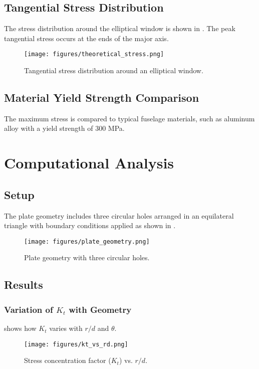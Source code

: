 \documentclass[a4paper,11pt]{article}
\begin{document}
\subsection{Tangential Stress Distribution}
The stress distribution around the elliptical window is shown in . The peak tangential stress occurs at the ends of the major axis.

\begin{figure}[H]
    \centering
    \texttt{[image: figures/theoretical\_stress.png]}
    \caption{Tangential stress distribution around an elliptical window.}
    \label{fig:theoretical_stress}
\end{figure}

\subsection{Material Yield Strength Comparison}
The maximum stress is compared to typical fuselage materials, such as aluminum alloy with a yield strength of 300 MPa.

\newpage

\section{Computational Analysis}
\subsection{Setup}
The plate geometry includes three circular holes arranged in an equilateral triangle with boundary conditions applied as shown in .
\begin{figure}[H]
    \centering
    \texttt{[image: figures/plate\_geometry.png]}
    \caption{Plate geometry with three circular holes.}
    \label{fig:plate_geometry}
\end{figure}

\subsection{Results}
\subsubsection{Variation of \(K_t\) with Geometry}
 shows how \(K_t\) varies with \(r/d\) and \(\theta\).

\begin{figure}[H]
    \centering
    \texttt{[image: figures/kt\_vs\_rd.png]}
    \caption{Stress concentration factor (\(K_t\)) vs. \(r/d\).}
    \label{fig:kt_vs_rd}
\end{figure}
\end{document}
